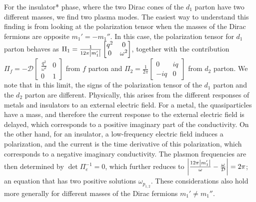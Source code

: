 \documentclass[aps,prl,twocolumn,superscriptaddress,floatfix, 10pt,longbibliography, nofootinbib]{revtex4-2}
\begin{document}
For the insulator* phase, where the two Dirac cones of the $d_1$ parton have two different masses, we find two plasma modes. The easiest way to understand this finding is from looking at the polarization tensor when the masses of the Dirac fermions are opposite $m_1'=-m_1''$. In this case, the polarization tensor for $d_1$ parton behaves as $\Pi_{1}=\frac{1}{12\pi \abs{m_1'}}\begin{bmatrix}
    q^2 & 0\\
    0& \omega^2
    \end{bmatrix}$, together with the contribution $\Pi_{f}=-\mathcal{D}\begin{bmatrix}
    \frac{q^2}{\omega^2} & 0\\
    0 & 1
    \end{bmatrix}$ from $f$ parton and $\Pi_{2}=\frac{1}{2\pi}\begin{bmatrix}
    0 & iq\\
    -iq & 0
    \end{bmatrix}$ from $d_2$ parton. We note that in this limit, the signs of the polarization tensor of the $d_1$ parton and the $d_2$ parton are different. Physically, this arises from the different responses of metals and insulators to an external electric field. For a metal, the quasiparticles have a mass, and therefore the current response to the external electric field is delayed, which corresponds to a positive imaginary part of the conductivity. On the other hand, for an insulator, a low-frequency electric field induces a polarization, and the current is the time derivative of this polarization, which corresponds to a negative imaginary conductivity. The plasmon frequencies are then determined by $\det\Pi_e^{-1}=0$, which further reduces to $\abs{\frac{12\pi \abs{m_1'}}{\omega}-\frac{\omega}{\mathcal{D}}}=2\pi$; an equation that has two positive solutions $\omega_{p_{1,2}}$. These considerations also hold more generally for different masses of the Dirac fermions $m_1'\neq m_1''$.


\end{document}
